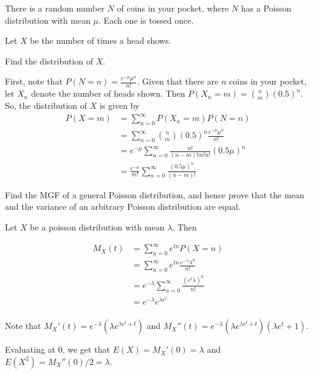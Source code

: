 \begin{problem}[Handout 10, \# 12]
  There is a random number \(N\) of coins in your pocket, where \(N\) has a
  Poisson distribution with mean \(\mu\). Each one is tossed once.

  \noindent Let \(X\) be the number of times a head shows.

  \noindent Find the distribution of \(X\).
\end{problem}
\begin{solution}
  First, note that $P(N=n) = \frac{e^{-\mu} \mu^n}{n!}$.  Given that there
  are $n$ coins in your pocket, let $X_n$ denote the number of heads
  shown. Then $P(X_n = m) = \binom{n}{m} \left( 0.5 \right)^n$.  So, the
  distribution of $X$ is given by
  \begin{align*}
    P(X=m) &= \sum\limits_{n=0}^\infty P(X_n = m) P(N=n) \\
           &= \sum\limits_{n=0}^\infty \binom{n}{m} \left( 0.5 \right)^n \frac{e^{-\mu} \mu^n}{n!} \\
           &= e^{-\mu} \sum\limits_{n=0}^\infty \frac{n!}{(n-m)!m!n!} (0.5 \mu)^n \\
           &= \frac{e^{-\mu}}{m!} \sum\limits_{n=0}^\infty \frac{(0.5 \mu)^n}{(n-m)!}
  \end{align*}
\end{solution}
\newpage

\begin{problem}[Handout 10, \# 14]
  Find the MGF of a general Poisson distribution, and hence prove that the
  mean and the variance of an arbitrary Poisson distribution are equal.
\end{problem}
\begin{solution}
Let $X$ be a poisson distribution with mean $\lambda$. Then

\begin{align*}
M_X(t) &= \sum\limits_{n=0}^\infty e^{tn} P(X = n) \\
&= \sum\limits_{n=0}^\infty e^{tn} \frac{e^{-\lambda} \lambda^n}{n!} \\
&= e^{-\lambda} \sum\limits_{n=0}^\infty \frac{(e^t \lambda)^n}{n!} \\
&= e^{-\lambda} e^{\lambda e^t} \\
\end{align*}

Note that $M_X'(t) = e^{-\lambda} \left(\lambda e^{\lambda e^t + t} \right)$ and $M_X''(t) = e^{-\lambda} \left(\lambda e^{\lambda e^t + t} \right) \left(\lambda e^t +1 \right)$.

Evaluating at $0$, we get that $E(X) = M_X'(0) = \lambda$ and $E(X^2) = M_X''(0) /2= \lambda$.
\end{solution}
\newpage

